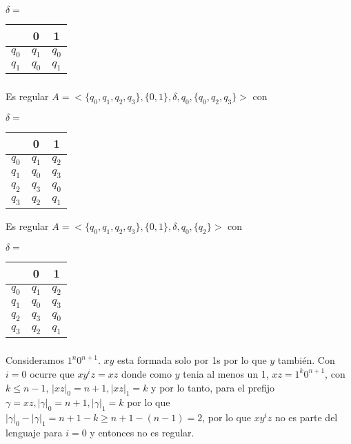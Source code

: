 $\delta = $

\begin{tabular}{c | c | c}
		& 0		& 1 	\\
\hline
$q_0$	& $q_1$	& $q_0$ \\
$q_1$	& $q_0$	& $q_1$ \\
\end{tabular}

\subsubsection{}
Es regular $A = <\{q_0,q_1,q_2,q_3\}, \{0,1\}, \delta, q_0, \{q_0,q_2,q_3\}>$ con

$\delta = $

\begin{tabular}{c | c | c}
		& 0		& 1 	\\
\hline
$q_0$	& $q_1$	& $q_2$ \\
$q_1$	& $q_0$	& $q_3$ \\
$q_2$	& $q_3$	& $q_0$ \\
$q_3$	& $q_2$	& $q_1$ \\
\end{tabular}


Es regular $A = <\{q_0,q_1,q_2,q_3\}, \{0,1\}, \delta, q_0, \{q_2\}>$ con

$\delta = $

\begin{tabular}{c | c | c}
		& 0		& 1 	\\
\hline
$q_0$	& $q_1$	& $q_2$ \\
$q_1$	& $q_0$	& $q_3$ \\
$q_2$	& $q_3$	& $q_0$ \\
$q_3$	& $q_2$	& $q_1$ \\
\end{tabular}

\subsubsection{}
Consideramos $1^n0^{n+1}$. $xy$ esta formada solo por 1s por lo que $y$ también. Con $i = 0$ ocurre que $xy^iz = xz$ donde como $y$ tenia al menos un 1, $xz = 1^k0^{n+1}$, con $k \leq n - 1$, $|xz|_0 = n + 1, |xz|_1 = k$ y por lo tanto, para el prefijo $\gamma = xz, |\gamma|_0 = n + 1, |\gamma|_1 = k$ por lo que $|\gamma|_0 - |\gamma|_1 = n + 1 - k \geq n + 1 - (n - 1) = 2$, por lo que $xy^iz$ no es parte del lenguaje para $i = 0$ y entonces no es regular.